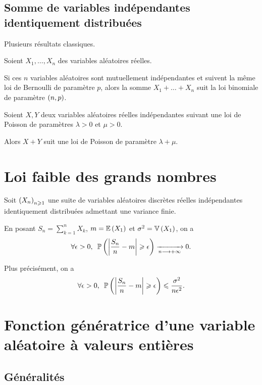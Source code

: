 \subsection{Somme de variables indépendantes identiquement distribuées}

Plusieurs résultats classiques.

\begin{prop}
Soient \(X_1,\dots,X_n\) des variables aléatoires réelles.

Si ces \(n\) variables aléatoires sont mutuellement indépendantes et suivent la même loi de Bernoulli de paramètre \(p\), alors la somme \(X_1+\dots+X_n\) suit la loi binomiale de paramètre \(\left(n,p\right)\).
\end{prop}

\begin{prop}
Soient \(X,Y\) deux variables aléatoires réelles indépendantes suivant une loi de Poisson de paramètres \(\lambda>0\) et \(\mu>0\).

Alors \(X+Y\) suit une loi de Poisson de paramètre \(\lambda+\mu\).
\end{prop}

\section{Loi faible des grands nombres}

\begin{prop}
Soit \(\left(X_n\right)_{n\geqslant1}\) une suite de variables aléatoires discrètes réelles indépendantes identiquement distribuées admettant une variance finie.

En posant \(S_n=\sum_{k=1}^nX_k\), \(m=\operatorname{\mathbb{E}}\left(X_1\right)\) et \(\sigma^2=\operatorname{\mathbb{V}}\left(X_1\right)\), on a \[\quantifs{\forall\epsilon>0}\proba{\abs{\dfrac{S_n}{n}-m}\geq\epsilon}\tendqd{n\to\pinf}0.\]

Plus précisément, on a \[\quantifs{\forall\epsilon>0}\proba{\abs{\dfrac{S_n}{n}-m}\geq\epsilon}\leq\dfrac{\sigma^2}{n\epsilon^2}.\]
\end{prop}

\section{Fonction génératrice d'une variable aléatoire à valeurs entières}

\subsection{Généralités}

